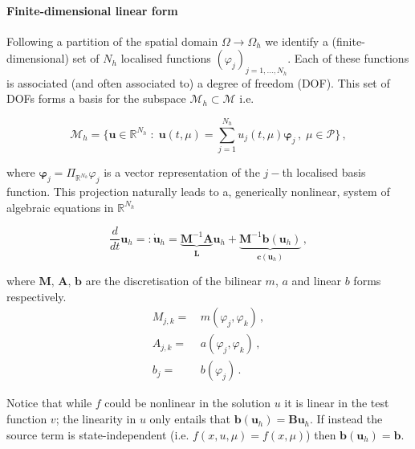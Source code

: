 \documentclass[../main.tex]{subfiles}
\begin{document}
\paragraph{Finite-dimensional linear form}\label{par:linear_form}

Following a partition of the spatial domain $\Omega\to \Omega_{h}$ we identify a (finite-dimensional) set of $N_{h}$ localised functions $(\varphi_{j})_{j=1,\dots,N_{h}}$.
Each of these functions is associated (and often associated to) a degree of freedom (DOF).
This set of DOFs forms a basis for the subspace $\mathcal{M}_{h}\subset\mathcal{M}$ i.e.

\begin{equation*}
        \mathcal{M}_{h} = \bigg\{\boldsymbol{u}\in \mathbb{R}^{N_{h}}\;:\;\boldsymbol{u}(t,\mu)=\sum_{j=1}^{N_{h}}u_{j}(t,\mu)\boldsymbol{\varphi}_{j}\,,\;\mu\in \mathcal{P}\bigg\}\,,
\end{equation*}

where $\boldsymbol{\varphi}_{j}=\Pi_{\mathbb{R}^{N_{h}}}\varphi_{j}$ is a vector representation of the $j-$th localised basis function.
This projection naturally leads to a, generically nonlinear, system of algebraic equations in $\mathbb{R}^{N_{h}}$

\begin{equation}\label{eq:dynamical_system}
        \frac{d}{dt}\boldsymbol{u}_{h} =: \dot{\boldsymbol{u}}_{h} = \underbrace{\boldsymbol{M}^{-1}\boldsymbol{A}}_{\boldsymbol{L}}\boldsymbol{u}_{h} + \underbrace{\boldsymbol{M}^{-1}\boldsymbol{b}(\boldsymbol{u}_{h})}_{\boldsymbol{c}(\boldsymbol{u}_{h})}\,,
\end{equation}

where $\boldsymbol{M},\,\boldsymbol{A},\,\boldsymbol{b}$ are the discretisation of the bilinear $m$, $a$ and linear $b$ forms respectively.
\begin{align*}
     M_{j,k} =& \, m(\varphi_{j},\varphi_{k}) \,, \nonumber \\
     A_{j,k} =& \, a(\varphi_{j},\varphi_{k}) \,, \nonumber \\
     b_{j}   =& \, b(\varphi_{j}) \,. \nonumber
\end{align*}

Notice that while $f$ could be nonlinear in the solution $u$ it is linear in the test function $v$; the linearity in $u$ only entails that $\boldsymbol{b}(\boldsymbol{u}_{h})=\boldsymbol{B}\boldsymbol{u}_{h}$.
If instead the source term is state-independent (i.e. $f(x,u,\mu)=f(x,\mu)$) then $\boldsymbol{b}(\boldsymbol{u}_{h}) = \boldsymbol{b}$.
\end{document}
